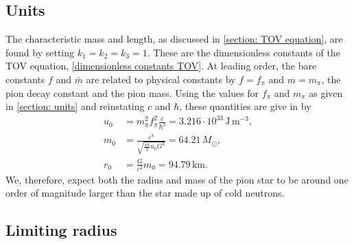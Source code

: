 \subsection{Units}

The characteristic mass and length, as discussed in \autoref{section: TOV equation}, are found by setting $k_1 = k_2 = k_3 = 1$.
These are the dimensionless constants of the TOV equation, \autoref{dimensionless constants TOV}.
At leading order, the bare constants $f$ and $\bar m$ are related to physical constants by $f = f_\pi$ and $m = m_\pi$, the pion decay constant and the pion mass.
Using the values for $f_\pi$ and $m_\pi$ as given in \autoref{section: units} and reinstating $c$ and $\hbar$, these quantities are give in by
%
\begin{align}
    u_0 & =m_\pi^2 f_\pi^2 \frac{c}{\hbar^3}
    = 3.216\cdot 10^{33} \, \text{J}\,\text{m}^{-3}, \\
    m_0 & = \frac{c^4}{\sqrt{\frac{4 \pi}{ 3} u_0 G^3}} = 64.21\, M_\odot, \\
    r_0 & = \frac{G}{c^2} m_0 = 94.79 \, \text{km}.
\end{align}
%
We, therefore, expect both the radius and mass of the pion star to be around one order of magnitude larger than the star made up of cold neutrons.

\subsection{Limiting radius}

